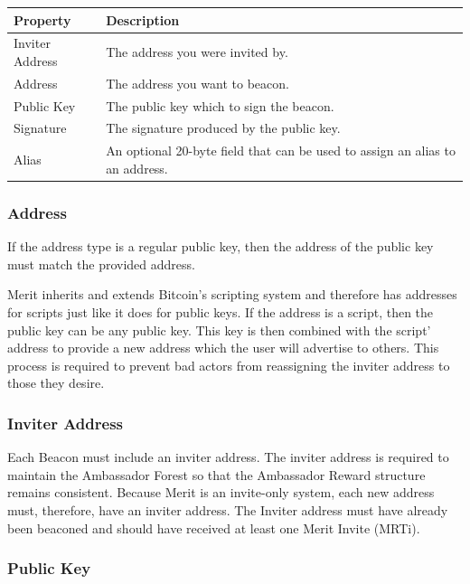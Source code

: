 \documentclass{article}
\begin{document}
\begin{center}
    \begin{tabular}{l|p{9cm}}
        Property & Description \\ \hline
        Inviter Address & The address you were invited by.  \\
        Address & The address you want to beacon.  \\
        Public Key & The public key which to sign the beacon.  \\
        Signature & The signature produced by the public key.  \\
        Alias & An optional 20-byte field that can be used to assign an alias to an address.\\
    \end{tabular}
\end{center}

\subsubsection{Address}
If the address type is a regular public key, then the address of the public 
key must match the provided address.

Merit inherits and extends Bitcoin's scripting system and therefore has addresses
for scripts just like it does for public keys.  If the address is a script, then
the public key can be any public key.  This key is then combined with the script' address to 
provide a new address which the user will advertise to others.  This process is
required to prevent bad actors from reassigning the \gls{inviter address} to those
they desire.

\subsubsection{Inviter Address}

Each Beacon must include an inviter address.  The inviter address is required to maintain the
Ambassador Forest so that the Ambassador Reward structure remains consistent.
Because Merit is an invite-only system, each new address must, therefore, have an
inviter address.  The Inviter address must have already been beaconed and should have received at least 
one Merit Invite (MRTi).

\subsubsection{Public Key}
\end{document}
